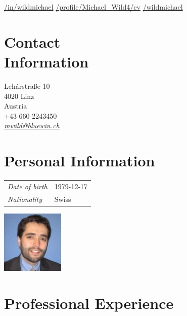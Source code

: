 \documentclass[line,11pt,a4paper]{resume}
\newcommand{\mail}[1]{\textsl{\href{mailto:#1}{#1}}}
\begin{document}
\begin{resume}
\vspace{-4mm}
\-\hspace{-12.3mm}\begin{minipage}{15cm}
\href{https://linkedin.com/in/wildmichael}{\faLinkedinSquare/in/wildmichael}\quad
\href{https://xing.com/profile/Michael_Wild4/cv}{\faXingSquare/profile/Michael\_Wild4/cv}\quad
\href{https://github.com/wildmichael}{\faGithubSquare/wildmichael}
\end{minipage}

\begin{multicols}{3}

\section{\mysidestyle Contact\\Information}\vspace{0.9mm}

Leh\'{a}rstra{\ss}e 10 \\
4020 Linz \\
Austria \\
+43 660 2243450 \\
\mail{mwild@bluewin.ch}\\

\columnbreak

\section{\mysidestyle Personal Information}\vspace{2mm}

\begin{tabular}{@{}ll}
\textsl{Date of birth} & 1979-12-17 \\
\textsl{Nationality}   & Swiss
\end{tabular}

\columnbreak
\vspace*{-9mm}\hfill\includegraphics[width=30mm]{mwild}

\end{multicols}

\section{\mysidestyle Professional Experience}\vspace{2mm}


\end{resume}
\end{document}
